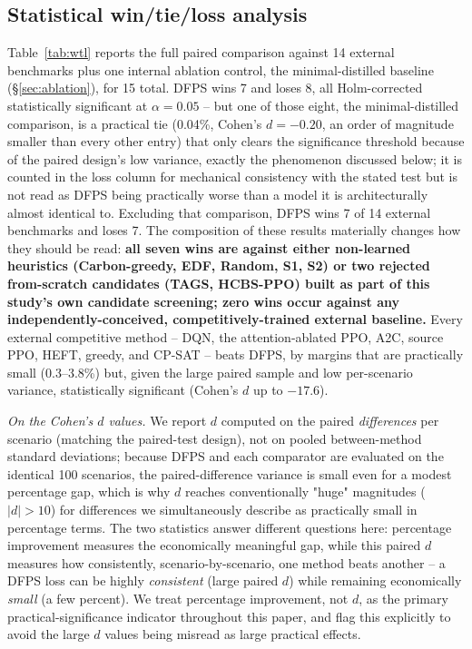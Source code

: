 \documentclass[journal]{IEEEtran}
\begin{document}
\subsection{Statistical win/tie/loss analysis}
Table~\ref{tab:wtl} reports the full paired comparison against 14 external benchmarks plus one internal ablation control, the minimal-distilled baseline (\S\ref{sec:ablation}), for 15 total. DFPS wins 7 and loses 8, all Holm-corrected statistically significant at $\alpha=0.05$ -- but one of those eight, the minimal-distilled comparison, is a practical tie (0.04\%, Cohen's $d=-0.20$, an order of magnitude smaller than every other entry) that only clears the significance threshold because of the paired design's low variance, exactly the phenomenon discussed below; it is counted in the loss column for mechanical consistency with the stated test but is not read as DFPS being practically worse than a model it is architecturally almost identical to. Excluding that comparison, DFPS wins 7 of 14 external benchmarks and loses 7. The composition of these results materially changes how they should be read: \textbf{all seven wins are against either non-learned heuristics (Carbon-greedy, EDF, Random, S1, S2) or two rejected from-scratch candidates (TAGS, HCBS-PPO) built as part of this study's own candidate screening; zero wins occur against any independently-conceived, competitively-trained external baseline.} Every external competitive method -- DQN, the attention-ablated PPO, A2C, source PPO, HEFT, greedy, and CP-SAT -- beats DFPS, by margins that are practically small (0.3--3.8\%) but, given the large paired sample and low per-scenario variance, statistically significant (Cohen's $d$ up to $-17.6$).

\textit{On the Cohen's $d$ values.} We report $d$ computed on the paired \emph{differences} per scenario (matching the paired-test design), not on pooled between-method standard deviations; because DFPS and each comparator are evaluated on the identical 100 scenarios, the paired-difference variance is small even for a modest percentage gap, which is why $d$ reaches conventionally "huge" magnitudes ($|d|>10$) for differences we simultaneously describe as practically small in percentage terms. The two statistics answer different questions here: percentage improvement measures the economically meaningful gap, while this paired $d$ measures how consistently, scenario-by-scenario, one method beats another -- a DFPS loss can be highly \emph{consistent} (large paired $d$) while remaining economically \emph{small} (a few percent). We treat percentage improvement, not $d$, as the primary practical-significance indicator throughout this paper, and flag this explicitly to avoid the large $d$ values being misread as large practical effects.
\end{document}
